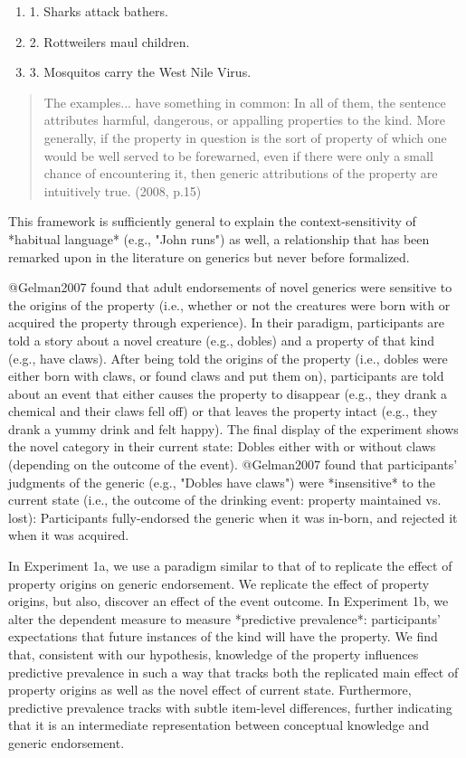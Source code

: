 \documentclass[floatsintext,doc]{apa6}
\begin{document}
\begin{enumerate}
\item 1. Sharks attack bathers.
\item 2. Rottweilers maul children. 
\item 3. Mosquitos carry the West Nile Virus.
\end{enumerate}


\begin{quote}
The examples... have something in common: In all of them, the sentence attributes harmful, dangerous, or appalling properties to the kind. More generally, if the property in question is the sort of property of which one would be well served to be forewarned, even if there were only a small chance of encountering it, then generic attributions of the property are intuitively true. (2008, p.15)
\end{quote}

\noindent 


This framework is sufficiently general to explain the context-sensitivity of *habitual language* (e.g., "John runs") as well, a relationship that has been remarked upon in the literature on generics \cite{Carlson, Leslie} but never before formalized. 

@Gelman2007 found that adult endorsements of novel generics were sensitive to the origins of the property (i.e., whether or not the creatures were born with or acquired the property through experience).
In their paradigm, participants are told a story about a novel creature (e.g., dobles) and a property of that kind (e.g., have claws).
After being told the origins of the property (i.e., dobles were either born with claws, or found claws and put them on), participants are told about an event that either causes the property to disappear (e.g., they drank a chemical and their claws fell off) or that leaves the property intact (e.g., they drank a yummy drink and felt happy).
The final display of the experiment shows the novel category in their current state: Dobles either with or without claws (depending on the outcome of the event).
@Gelman2007 found that participants' judgments of the generic (e.g., "Dobles have claws") were *insensitive* to the current state (i.e., the outcome of the drinking event: property maintained vs. lost): Participants fully-endorsed the generic when it was in-born, and rejected it when it was acquired.

In Experiment 1a, we use a paradigm similar to that of  to replicate the effect of property origins on generic endorsement.
We replicate the effect of property origins, but also, discover an effect of the event outcome.
In Experiment 1b, we alter the dependent measure to measure *predictive prevalence*: participants' expectations that future instances of the kind will have the property.
We find that, consistent with our hypothesis, knowledge of the property influences predictive prevalence in such a way that tracks both the replicated main effect of property origins as well as the novel effect of current state.
Furthermore, predictive prevalence tracks with subtle item-level differences, further indicating that it is an intermediate representation between conceptual knowledge and generic endorsement.
\end{document}
